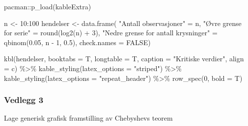 \documentclass[
]{book}
\newenvironment{Shaded}{\begin{snugshade}}{\end{snugshade}}
\newcommand{\AttributeTok}[1]{\textcolor[rgb]{0.77,0.63,0.00}{#1}}
\newcommand{\ConstantTok}[1]{\textcolor[rgb]{0.00,0.00,0.00}{#1}}
\newcommand{\DecValTok}[1]{\textcolor[rgb]{0.00,0.00,0.81}{#1}}
\newcommand{\FloatTok}[1]{\textcolor[rgb]{0.00,0.00,0.81}{#1}}
\newcommand{\FunctionTok}[1]{\textcolor[rgb]{0.00,0.00,0.00}{#1}}
\newcommand{\NormalTok}[1]{#1}
\newcommand{\OtherTok}[1]{\textcolor[rgb]{0.56,0.35,0.01}{#1}}
\newcommand{\SpecialCharTok}[1]{\textcolor[rgb]{0.00,0.00,0.00}{#1}}
\newcommand{\StringTok}[1]{\textcolor[rgb]{0.31,0.60,0.02}{#1}}
\begin{document}
\begin{Shaded}
\begin{Highlighting}[]
\NormalTok{pacman}\SpecialCharTok{::}\FunctionTok{p\_load}\NormalTok{(kableExtra)}

\NormalTok{n }\OtherTok{\textless{}{-}} \DecValTok{10}\SpecialCharTok{:}\DecValTok{100}
\NormalTok{hendelser }\OtherTok{\textless{}{-}} \FunctionTok{data.frame}\NormalTok{(}
  \StringTok{"Antall observasjoner"}                \OtherTok{=}\NormalTok{ n,}
  \StringTok{"Øvre grense for serie"}               \OtherTok{=} \FunctionTok{round}\NormalTok{(}\FunctionTok{log2}\NormalTok{(n) }\SpecialCharTok{+} \DecValTok{3}\NormalTok{),}
  \StringTok{"Nedre grense for antall krysninger"}  \OtherTok{=} \FunctionTok{qbinom}\NormalTok{(}\FloatTok{0.05}\NormalTok{, n }\SpecialCharTok{{-}} \DecValTok{1}\NormalTok{, }\FloatTok{0.5}\NormalTok{),}
  \AttributeTok{check.names =} \ConstantTok{FALSE}\NormalTok{)}

\FunctionTok{kbl}\NormalTok{(hendelser, }\AttributeTok{booktabs =}\NormalTok{ T,  }\AttributeTok{longtable =}\NormalTok{ T, }\AttributeTok{caption =} \StringTok{"Kritiske verdier"}\NormalTok{, }\AttributeTok{align =} \StringTok{\textquotesingle{}c\textquotesingle{}}\NormalTok{) }\SpecialCharTok{\%\textgreater{}\%}
  \FunctionTok{kable\_styling}\NormalTok{(}\AttributeTok{latex\_options =} \StringTok{"striped"}\NormalTok{) }\SpecialCharTok{\%\textgreater{}\%}
  \FunctionTok{kable\_styling}\NormalTok{(}\AttributeTok{latex\_options =} \StringTok{"repeat\_header"}\NormalTok{) }\SpecialCharTok{\%\textgreater{}\%}
  \FunctionTok{row\_spec}\NormalTok{(}\DecValTok{0}\NormalTok{, }\AttributeTok{bold =}\NormalTok{ T)}
\end{Highlighting}
\end{Shaded}

\hypertarget{vedlegg-3}{%
\subsubsection*{Vedlegg 3}\label{vedlegg-3}}

Lage generisk grafisk framstilling av Chebyshevs teorem
\end{document}
